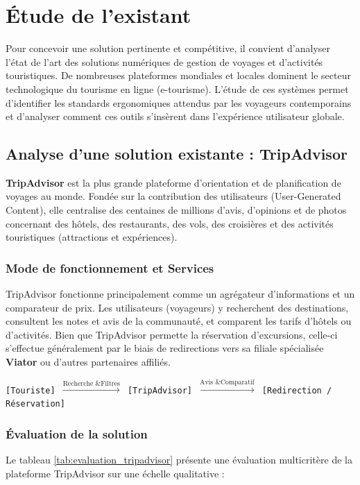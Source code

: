 \documentclass[12pt,a4paper]{report}
\begin{document}
\section{Étude de l'existant}
Pour concevoir une solution pertinente et compétitive, il convient d'analyser l'état de l'art des solutions numériques de gestion de voyages et d'activités touristiques. De nombreuses plateformes mondiales et locales dominent le secteur technologique du tourisme en ligne (e-tourisme). L'étude de ces systèmes permet d'identifier les standards ergonomiques attendus par les voyageurs contemporains et d'analyser comment ces outils s'insèrent dans l'expérience utilisateur globale.

\subsection{Analyse d'une solution existante : TripAdvisor}
\textbf{TripAdvisor} est la plus grande plateforme d'orientation et de planification de voyages au monde. Fondée sur la contribution des utilisateurs (User-Generated Content), elle centralise des centaines de millions d'avis, d'opinions et de photos concernant des hôtels, des restaurants, des vols, des croisières et des activités touristiques (attractions et expériences).

\subsubsection{Mode de fonctionnement et Services}
TripAdvisor fonctionne principalement comme un agrégateur d’informations et un comparateur de prix. Les utilisateurs (voyageurs) y recherchent des destinations, consultent les notes et avis de la communauté, et comparent les tarifs d'hôtels ou d'activités. Bien que TripAdvisor permette la réservation d'excursions, celle-ci s'effectue généralement par le biais de redirections vers sa filiale spécialisée \textbf{Viator} ou d'autres partenaires affiliés.

\begin{center}
    \texttt{[Touriste] $\xrightarrow{\text{Recherche \& Filtres}}$ [TripAdvisor] $\xrightarrow{\text{Avis \& Comparatif}}$ [Redirection / Réservation]}
\end{center}

\subsubsection{Évaluation de la solution}
Le tableau \ref{tab:evaluation_tripadvisor} présente une évaluation multicritère de la plateforme TripAdvisor sur une échelle qualitative :
\end{document}
